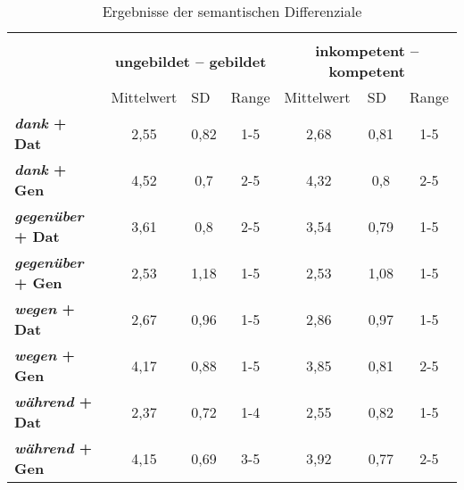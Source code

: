 \begin{table}
\begin{small}
\begin{tabular}{lcccccc}
                         & \multicolumn{1}{l}{}           & \multicolumn{1}{l}{}   & \multicolumn{1}{l}{} & \multicolumn{1}{l}{}           & \multicolumn{1}{l}{}   & \multicolumn{1}{l}{} \\
                         & \multicolumn{3}{c}{\textbf{ungebildet -- gebildet}}                            & \multicolumn{3}{|c}{\textbf{inkompetent -- kompetent}}                          \\
                         & \multicolumn{1}{l}{Mittelwert} & \multicolumn{1}{l}{SD} & Range                & \multicolumn{1}{|l}{Mittelwert} & \multicolumn{1}{l}{SD} & Range                \\
\rowcolor[HTML]{C0C0C0} 
\textbf{\textit{dank} + Dat}      & 2,55                           & 0,82                   & 1-5                  & 2,68                           & 0,81                   & 1-5                  \\
\textbf{\textit{dank} + Gen}      & 4,52                           & 0,7                    & 2-5                  & 4,32                           & 0,8                    & 2-5                  \\
\rowcolor[HTML]{C0C0C0} 
\textbf{\textit{gegenüber} + Dat} & 3,61                           & 0,8                    & 2-5                  & 3,54                           & 0,79                   & 1-5                  \\
\textbf{\textit{gegenüber} + Gen} & 2,53                           & 1,18                   & 1-5                  & 2,53                           & 1,08                   & 1-5                  \\
\rowcolor[HTML]{C0C0C0} 
\textbf{\textit{wegen} + Dat}     & 2,67                           & 0,96                   & 1-5                  & 2,86                           & 0,97                   & 1-5                  \\
\textbf{\textit{wegen} + Gen}     & 4,17                           & 0,88                   & 1-5                  & 3,85                           & 0,81                   & 2-5                  \\
\rowcolor[HTML]{C0C0C0} 
\textbf{\textit{während} + Dat}   & 2,37                           & 0,72                   & 1-4                  & 2,55                           & 0,82                   & 1-5                  \\
\textbf{\textit{während} + Gen}   & 4,15                           & 0,69                   & 3-5                  & 3,92                           & 0,77                   & 2-5                 
\end{tabular}
\end{small}
\caption{Ergebnisse der semantischen Differenziale}
\label{table:WerteSemDiffAnh}
\end{table}

